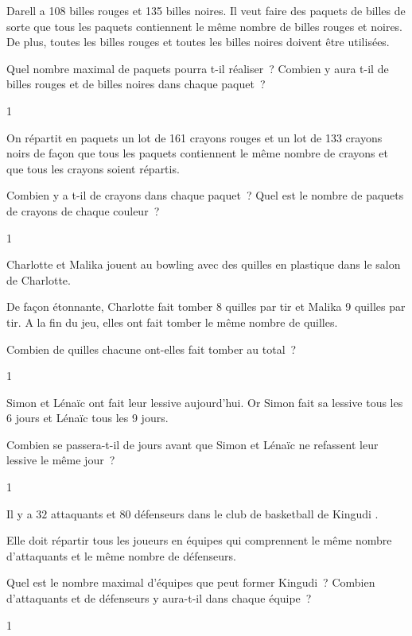 \documentclass[a4paper,11pt]{report}
\begin{document}
\begin{exo}{ %
    Darell a 108 billes rouges et 135 billes noires. Il veut faire des paquets de billes de sorte que tous les paquets contiennent le même nombre de billes rouges et noires.
    De plus, toutes les billes rouges et toutes les billes noires doivent être utilisées.
    \begin{tasks}
        \task Quel nombre maximal de paquets pourra t-il réaliser~?
        \task Combien y aura t-il de billes rouges et de billes noires dans chaque paquet~?
    \end{tasks}
}{1}\end{exo}


\begin{exo}{ %
    On répartit en paquets un lot de 161 crayons rouges et un lot de 133 crayons noirs de façon que tous les paquets contiennent le même nombre de crayons et que tous les crayons soient répartis.
    \begin{tasks}
        \task Combien y a t-il de crayons dans chaque paquet~?
        \task Quel est le nombre de paquets de crayons de chaque couleur~?
    \end{tasks}
}{1}\end{exo}


\begin{exo}{ %
    Charlotte et Malika jouent au bowling avec des quilles en plastique dans le salon de Charlotte. 

    De façon étonnante, Charlotte fait tomber 8 quilles par tir et Malika 9 quilles par tir. A la fin du jeu, elles ont fait tomber le même nombre de quilles.

    Combien de quilles chacune ont-elles fait tomber au total~? 
}{1}\end{exo}


\begin{exo}{ %
    Simon et Lénaïc ont fait leur lessive aujourd'hui. Or Simon fait sa lessive tous les 6 jours et Lénaïc tous les 9 jours. 

    Combien se passera-t-il de jours avant que Simon et Lénaïc ne refassent leur lessive le même jour~? 
}{1}\end{exo}




\begin{exo}{ %
    Il y a $32$ attaquants et $80$ défenseurs dans le club de basketball de Kingudi . 

     Elle doit répartir tous les joueurs en équipes qui comprennent le même nombre d'attaquants et le même nombre de défenseurs. 
    \begin{tasks}
        \task Quel est le nombre maximal d'équipes que peut former Kingudi~?
        \task Combien d'attaquants et de défenseurs y aura-t-il dans chaque équipe~?
    \end{tasks}
}{1}\end{exo}
\end{document}
